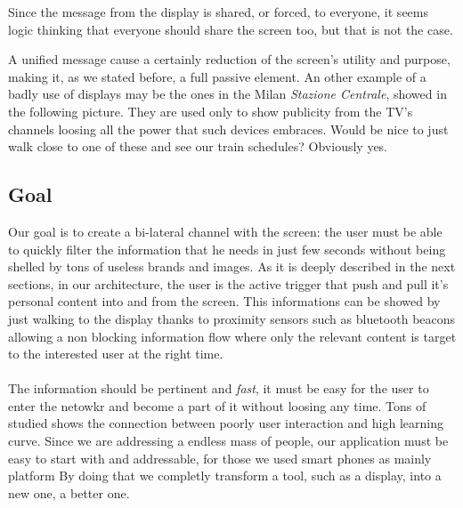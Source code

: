 \documentclass[]{usiinfbachelorproject}
\begin{document}
\begin{figure}[H]
  \centering
\end{figure} 
Since the message from the display is shared, or forced, to everyone, it seems logic thinking that everyone should share the screen too, but that is not the case.

A unified message cause a certainly reduction of the screen's utility and purpose, making it, as we stated before, a full passive element. An other example of a badly use of displays may be the ones in the Milan \emph{Stazione Centrale}, showed in the following picture.
They are used only to show publicity from the TV's channels loosing all the power that such devices embraces. Would be nice to just walk close to one of these and see our train schedules? Obviously yes. 


\subsection{Goal}

Our goal is to create a bi-lateral channel with the screen: the user must be able to quickly filter the information that he needs in just few seconds without being shelled by tons of useless brands and images. As it is deeply described in the next sections, in our architecture, the user is the active trigger that push and pull it's personal content into and from the screen. This informations can be showed by just walking to the display thanks to proximity sensors such as bluetooth beacons allowing a non blocking information flow where only the relevant content is target to the interested user at the right time.
\\
\\
The information should be pertinent and \emph{fast}, it must be easy for the user to enter the netowkr and become a part of it without loosing any time. Tons of studied shows the connection between poorly user interaction and high learning curve. Since we are addressing a endless mass of people, our application must be easy to start with and addressable, for those we used smart phones as mainly platform
By doing that we completly transform a tool, such as a display, into a new one, a better one.
\end{document}
